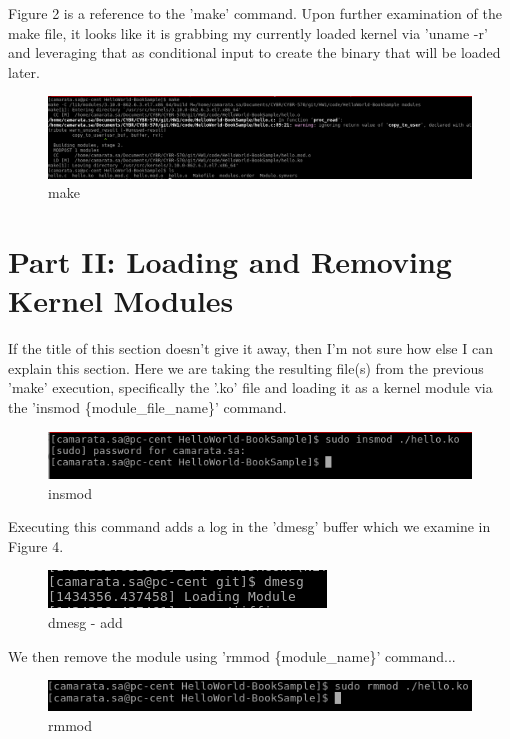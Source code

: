\documentclass[10pt]{article}
\begin{document}
Figure 2 is a reference to the 'make' command.  Upon further examination of the make file, it looks like it is grabbing my currently loaded kernel via 'uname -r' and leveraging that as conditional input to create the binary that will be loaded later.

\begin{figure}[!h]
\centering
\includegraphics[scale=0.5]{./images/ss2.png}
\caption{make}
\label{fig:Code}
\end{figure}

\section{Part II: Loading and Removing Kernel Modules}
If the title of this section doesn't give it away, then I'm not sure how else I can explain this section.  Here we are taking the resulting file(s) from the previous 'make' execution, specifically the '.ko' file and loading it as a kernel module via the 'insmod \{module\_file\_name\}' command.

\begin{figure}[!h]
\centering
\includegraphics[scale=0.5]{./images/ss3.png}
\caption{insmod}
\label{fig:Code}
\end{figure}

Executing this command adds a log in the 'dmesg' buffer which we examine in Figure 4.

\begin{figure}[!h]
\centering
\includegraphics[scale=0.5]{./images/ss4.png}
\caption{dmesg - add}
\label{fig:Code}
\end{figure}

We then remove the module using 'rmmod \{module\_name\}' command...

\begin{figure}[!h]
\centering
\includegraphics[scale=0.5]{./images/ss5.png}
\caption{rmmod}
\label{fig:Code}
\end{figure}
\end{document}
